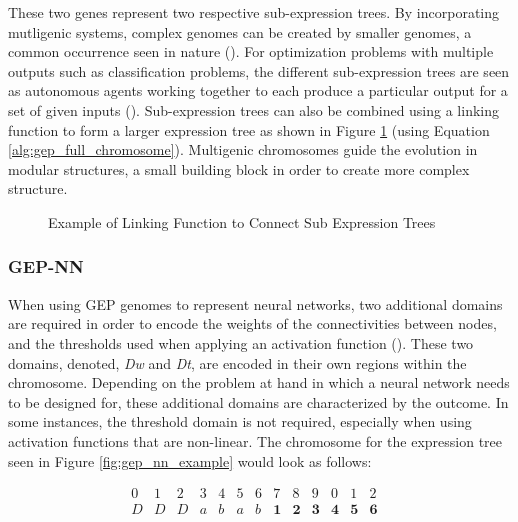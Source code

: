 \parbreak\noindent These two genes represent two respective sub-expression trees. By incorporating mutligenic systems, complex genomes can be created by smaller genomes, a common occurrence seen in nature (\cite{ferreira2006gene}). For optimization problems with multiple outputs such as classification problems, the different sub-expression trees are seen as autonomous agents working together to each produce a particular output for a set of given inputs (\cite{ferreira2006gene}). Sub-expression trees can also be combined using a linking function to form a larger expression tree as shown in Figure \ref{fig:gep_linking_function} (using Equation \ref{alg:gep_full_chromosome}). Multigenic chromosomes guide the evolution in modular structures, a small building block in order to create more complex structure.

\parbreak
\begin{figure}[H] %
	\centering %
	\caption{Example of Linking Function to Connect Sub Expression Trees}
	\label{fig:gep_linking_function} %
\end{figure}

\subsubsection{GEP-NN}
When using GEP genomes to represent neural networks, two additional domains are required in order to encode the weights of the connectivities between nodes, and the thresholds used when applying an activation function (\cite{ferreira2006gene}). These two domains, denoted, \textit{Dw} and \textit{Dt}, are encoded in their own regions within the chromosome. Depending on the problem at hand in which a neural network needs to be designed for, these additional domains are characterized by the outcome. In some instances, the threshold domain is not required, especially when using activation functions that are non-linear. The chromosome for the expression tree seen in Figure \ref{fig:gep_nn_example} would look as follows:
\begin{ceqn}
    \begin{equation}\label{alg:gep__nn_chromosome_example}
        \begin{array}{cccccccccccccccccc}
            0 & 1 & 2 & 3 & 4 & 5 & 6 & 7 & 8 & 9 & 0 & 1 & 2 \\
            D & D & D & a & b & a & b & \textbf{1} & \textbf{2} & \textbf{3} & \textbf{4} & \textbf{5} & \textbf{6} &
        \end{array}
    \end{equation}
\end{ceqn}

